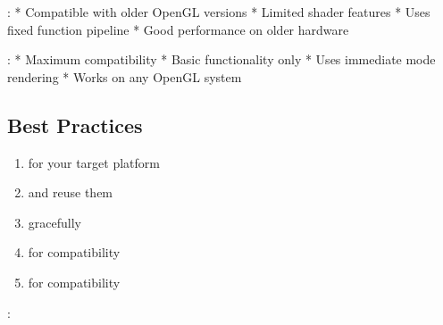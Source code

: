 \documentclass[a4paper,10pt,english,openany,oneside]{sphinxmanual}
\begin{document}
\sphinxAtStartPar
{}:
* Compatible with older OpenGL versions
* Limited shader features
* Uses fixed function pipeline
* Good performance on older hardware

\sphinxAtStartPar
{}:
* Maximum compatibility
* Basic functionality only
* Uses immediate mode rendering
* Works on any OpenGL system


\subsection{Best Practices}
\label{\detokenize{api/shaders:best-practices}}\begin{enumerate}
%
\item {} 
\sphinxAtStartPar
{} for your target platform

\item {} 
\sphinxAtStartPar
{} and reuse them

\item {} 
\sphinxAtStartPar
{} gracefully

\item {} 
\sphinxAtStartPar
{} for compatibility

\item {} 
\sphinxAtStartPar
{} for compatibility

\end{enumerate}

\sphinxAtStartPar
{}:
\end{document}
